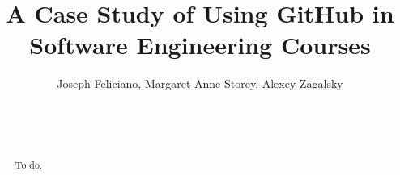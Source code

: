 \documentclass{acm_proc_article-sp}
\begin{document}
\title{A Case Study of Using GitHub in Software Engineering Courses}
%
%
%
%
%

%
\author{
	\alignauthor Joseph Feliciano, Margaret-Anne Storey, Alexey Zagalsky\\
	\\
	\\
	\\
}

\maketitle
\begin{abstract}
To do.
\end{abstract}

\end{document}
